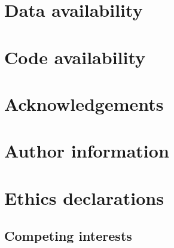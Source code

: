 \section{Data availability}

\section{Code availability}

\section{Acknowledgements}

\section{Author information}

\section{Ethics declarations}

\subsection{Competing interests}
